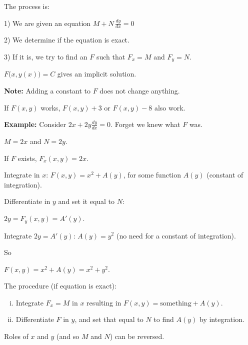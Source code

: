 \documentclass[10pt,aspectratio=169]{beamer}
\begin{document}
\begin{frame}
The process is:

\medskip

1) We are given an equation
\quad
$M + N \, \frac{dy}{dx} = 0$

\medskip
\pause

2) We determine if the equation is exact.

\medskip
\pause

3) If it is, we try to find an $F$ such that $F_x = M$
and $F_y = N$.

\medskip
\pause

$F\bigl(x,y(x)\bigr) = C$ gives an implicit solution.

\medskip
\pause

\textbf{Note:} Adding a constant to $F$ does not change anything.

\pause
If $F(x,y)$ works, $F(x,y)+3$ or $F(x,y)-8$ also work.

\end{frame}

\begin{frame}

\textbf{Example:}
Consider \quad $2x + 2y \frac{dy}{dx} = 0$. \quad  Forget we knew
what $F$ was.

\medskip
\pause

$M = 2x$ and $N=2y$.

\medskip
\pause

If $F$ exists, $F_x (x,y) = 2x$.

\medskip
\pause

Integrate in $x$:
\quad
$F(x,y) = x^2 + A(y)$,
\quad
for some function $A(y)$ (constant of integration).

\medskip
\pause

Differentiate in $y$ and set it equal to $N$:

\medskip
\quad
$2y = F_y (x,y) = A'(y)$.

\medskip
\pause

Integrate $2y=A'(y)$: \quad
$A(y) = y^2$ \quad (no need for a constant of integration).

\medskip
\pause

So

\medskip

\quad
$F(x,y) = x^2 + A(y) = x^2+y^2$.

\end{frame}

\begin{frame}

The procedure (if equation is exact):
\begin{enumerate}[(i)]
\item
\pause
Integrate $F_x = M$ in $x$ resulting in $F(x,y) = \text{something} + A(y)$.
\item
\pause
Differentiate $F$ in $y$, and set that equal to
$N$ to find $A(y)$ by integration.
\end{enumerate}
\pause
Roles of $x$ and $y$ (and so $M$ and $N$) can be reversed.

\end{frame}
\end{document}
